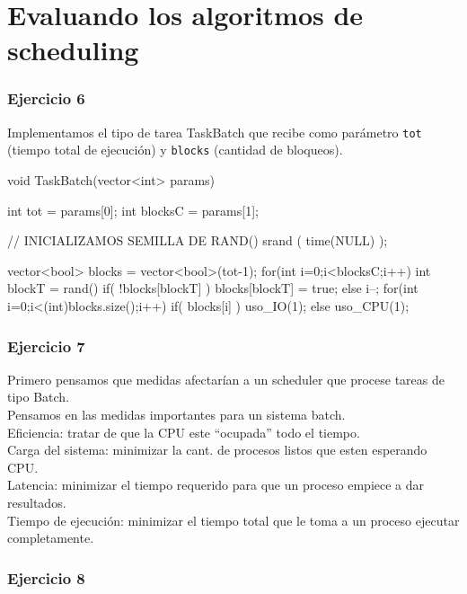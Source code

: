 \part{Evaluando los algoritmos de scheduling}

\section{Ejercicio 6}

Implementamos el tipo de tarea TaskBatch que recibe como par\'ametro \verb|tot| (tiempo total de ejecuci\'on) y \verb|blocks| (cantidad de bloqueos).

\begin{framed}
\begin{verbatimtab}
void TaskBatch(vector<int> params) {
	int tot = params[0];
	int blocksC = params[1];
	
	// INICIALIZAMOS SEMILLA DE RAND()
	srand ( time(NULL) );
	
	vector<bool> blocks = vector<bool>(tot-1);
	for(int i=0;i<blocksC;i++) {
		int blockT = rand()%
		if( !blocks[blockT] )
			blocks[blockT] = true;
		else
			i--;
	}
	for(int i=0;i<(int)blocks.size();i++) {
		if( blocks[i] )
			uso_IO(1);
		else
			uso_CPU(1);
	}
}
\end{verbatimtab}
\end{framed}

\section{Ejercicio 7}

Primero pensamos que medidas afectar\'ian a un scheduler que procese tareas de tipo Batch.\\
Pensamos en las medidas importantes para un sistema batch.\\
Eficiencia: tratar de que la CPU este ``ocupada'' todo el tiempo.\\
Carga del sistema: minimizar la cant. de procesos listos que esten esperando CPU.\\
Latencia: minimizar el tiempo requerido para que un proceso empiece a dar resultados.\\
Tiempo de ejecuci\'on: minimizar el tiempo total que le toma a un proceso ejecutar completamente.

\section{Ejercicio 8}

